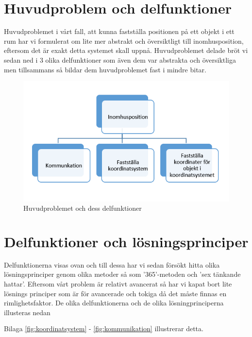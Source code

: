 \documentclass[11pt, a4paper]{report}
\begin{document}
\clearpage


\section{Huvudproblem och delfunktioner}

Huvudproblemet i vårt fall, att kunna fastställa positionen på ett objekt i ett rum har vi formulerat om lite mer abstrakt och översiktligt till inomhusposition, eftersom det är exakt detta systemet skall uppnå. Huvudproblemet delade bröt vi sedan ned i 3 olika delfunktioner som även dem var abstrakta och översiktliga men tillsammans så bildar dem huvudproblemet fast i mindre bitar.

\begin{figure}[H]
	\begin{center}
		\includegraphics [width=12cm,angle=0]{delfunktioner.png}
		\caption{Huvudproblemet och dess delfunktioner}
		\label{fig:huvudproblem}
	\end{center}
\end{figure}


\section{Delfunktioner och lösningsprinciper}

Delfunktionerna visas ovan och till dessa har vi sedan försökt hitta olika lösningsprinciper genom olika metoder så som '365'-metoden och 'sex tänkande hattar'. Eftersom vårt problem är relativt avancerat så har vi kapat bort lite lösnings principer som är för avancerade och tokiga då det måste finnas en rimlighetsfaktor. De olika delfunktionerna och de olika lösningprinciperna illusteras nedan

Bilaga \ref{fig:koordinatsystem} - \ref{fig:kommunikation} illustrerar detta.
\end{document}
